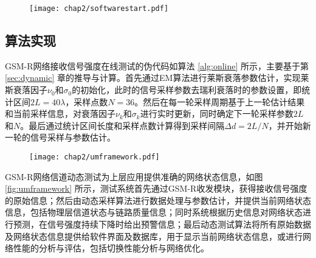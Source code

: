 \begin{figure}[!htp]
\centering
    \texttt{[image: chap2/softwarestart.pdf]}
\end{figure}

\subsection{算法实现}
\label{sec:alggsmr}

GSM-R网络接收信号强度在线测试的伪代码如算法 \ref{alg:online} 所示，主要基于第 \ref{sec:dynamic} 章的推导与计算。首先通过EM算法进行莱斯衰落参数估计，实现莱斯衰落因子$\nu_0$和$\sigma_0$的初始化，此时的信号采样参数去瑞利衰落时的参数设置，即统计区间$2L=40\lambda$，采样点数$N=36$。然后在每一轮采样周期基于上一轮估计结果和当前采样信息，对衰落因子$\nu_k$和$\sigma_k$进行实时更新，同时确定下一轮采样参数$2L$和$N$。最后通过统计区间长度和采样点数计算得到采样间隔$\Delta d=2L/N$，并开始新一轮的信号采样与参数估计。

\begin{figure}[!htp]
\centering
    \texttt{[image: chap2/umframework.pdf]}
\end{figure}

GSM-R网络信道动态测试为上层应用提供准确的网络状态信息，如图 \ref{fig:umframework} 所示，测试系统首先通过GSM-R收发模块，获得接收信号强度的原始信息；然后由动态采样算法进行数据处理与参数估计，并提供当前网络状态信息，包括物理层信道状态与链路质量信息；同时系统根据历史信息对网络状态进行预测，在信号强度持续下降时给出预警信息；最后动态测试算法将所有原始数据及网络状态信息提供给软件界面及数据库，用于显示当前网络状态信息，或进行网络性能的分析与评估，包括切换性能分析与网络优化。


